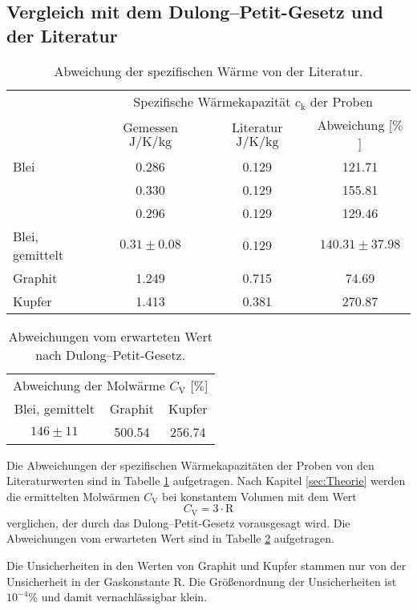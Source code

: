 \subsection{Vergleich mit dem Dulong--Petit-Gesetz und der Literatur}
\begin{table}[htbp]
	\centering
	\begin{tabular}{lccc}
		\toprule
		&\multicolumn{3}{c}{Spezifische Wärmekapazität $c_\text{k}$ der Proben}\\
		&{Gemessen $\si{\joule\per\kelvin\per\kilo\gram}$}  &{Literatur $\si{\joule\per\kelvin\per\kilo\gram}$}& {Abweichung [$\%$]}\\
		\midrule
		{Blei}	&0.286	&0.129	&121.71\\
				&0.330	&0.129	&155.81\\
				&0.296	&0.129	&129.46\\
		{Blei, gemittelt}	&$0.31\pm0.08$	&0.129	&$140.31\pm 37.98$\\
		{Graphit}&1.249 &0.715& 74.69\\
		{Kupfer}&1.413	&0.381	& 270.87\\
		\bottomrule
	\end{tabular}
	\caption{Abweichung der spezifischen Wärme von der Literatur\cite{SpeziWaerme}.}
	\label{tab:compare}
\end{table}
\begin{table}[htbp]
	\centering
	\begin{tabular}{ccc}
		\toprule
		\multicolumn{3}{c}{Abweichung der Molwärme $C_\text{V}$ [$\%$]}\\
		{Blei, gemittelt}	&{Graphit}&{Kupfer}\\
		\midrule
		$146\pm11$	&500.54	&256.74\\
		\bottomrule
	\end{tabular}
	\caption{Abweichungen vom erwarteten Wert nach Dulong--Petit-Gesetz.}
	\label{tab:failz}
\end{table}
Die Abweichungen der spezifischen Wärmekapazitäten der Proben von den Literaturwerten sind in Tabelle \ref{tab:compare} aufgetragen.
Nach Kapitel \ref{sec:Theorie} werden die ermittelten Molwärmen $C_\mathup{V}$ bei konstantem Volumen mit dem Wert
\begin{equation}
	C_\mathup{V} = 3\cdot \mathup{R}
\end{equation}
verglichen, der durch das Dulong--Petit-Gesetz vorausgesagt wird.
Die Abweichungen vom erwarteten Wert sind in Tabelle \ref{tab:failz} aufgetragen. 

Die Unsicherheiten in den Werten von Graphit und Kupfer stammen nur von der Unsicherheit in der Gaskonstante $\mathup{R}$. 
Die Größenordnung der Unsicherheiten ist $10^{-4}\%$ und damit vernachlässigbar klein.